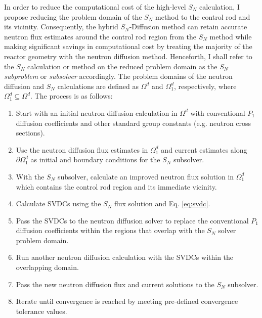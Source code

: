 In order to reduce the computational cost of the high-level $S_N$ calculation, I propose reducing
the problem domain of the $S_N$ method to the control rod and its vicinity. Consequently, the
hybrid $S_N$-Diffusion method can retain accurate neutron flux estimates around the control rod
region from the $S_N$ method while making significant savings in computational cost by treating the
majority of the reactor geometry with the neutron diffusion method. Henceforth, I shall refer to
the $S_N$ calculation or method on the reduced problem domain as the $S_N$ \textit{subproblem} or
\textit{subsolver} accordingly. The problem domains of the neutron diffusion and $S_N$ calculations
are defined as $\Omega^d$ and $\Omega^d_1$, respectively, where $\Omega^d_1 \subseteq \Omega^d$.
The process is as follows:
%
%
\begin{enumerate}
  \item Start with an initial neutron diffusion calculation in $\Omega^d$ with conventional $P_1$
    diffusion coefficients and other standard group constants (e.g. neutron cross sections).
  \item Use the neutron diffusion flux estimates in $\Omega^d_1$ and current estimates along
    $\partial \Omega^d_1$ as initial and boundary conditions for the $S_N$ subsolver.
  \item With the $S_N$ subsolver, calculate an improved neutron flux solution in $\Omega^d_1$ which
    contains the control rod region and its immediate vicinity.
  \item Calculate \glspl{SVDC} using the $S_N$ flux solution and Eq. \ref{eq:svdc}.
  \item Pass the \glspl{SVDC} to the neutron diffusion solver to replace the conventional
    $P_1$ diffusion coefficients within the regions that overlap with the $S_N$ solver problem
    domain.
  \item Run another neutron diffusion calculation with the \glspl{SVDC} within the overlapping
    domain.
  \item Pass the new neutron diffusion flux and current solutions to the $S_N$ subsolver.
  \item Iterate until convergence is reached by meeting pre-defined convergence tolerance values.
\end{enumerate}

